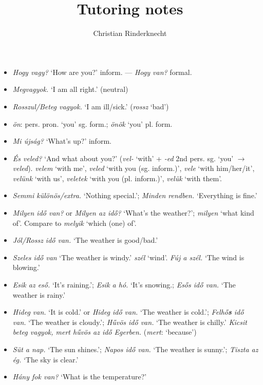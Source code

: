 \documentclass[a4paper,11pt]{article}
\title{Tutoring notes}
\date{\oldstylenums{2026}}
\author{Christian Rinderknecht}
\begin{document}
\maketitle

\begin{itemize}

  \item \emph{Hogy vagy?} `How are you?' inform. --- \emph{Hogy van?}
    formal.

  \item \emph{Megvagyok.} `I am all right.' (neutral)

  \item \emph{Rosszul/Beteg vagyok.} `I am ill/sick.' (\emph{rossz}
    `bad')

  \item \emph{ön}: pers. pron. `you' sg. form.; \emph{önök} `you'
    pl. form.

  \item \emph{Mi újság?} `What's up?' inform.

  \item \emph{És veled?} `And what about you?' (\emph{vel-} `with' +
    \emph{-ed} 2nd pers. sg. `you' $\rightarrow$
    \emph{veled}). \emph{velem} `with me', \emph{veled} `with you
    (sg. inform.)', \emph{vele} `with him/her/it', \emph{velünk} `with
    us', \emph{veletek} `with you (pl. inform.)', \emph{velük} `with
    them'.

  \item \emph{Semmi különös/extra.} `Nothing special.'; \emph{Minden
  rendben.} `Everything is fine.'

  \item \emph{Milyen idő van?} or \emph{Milyen az idő?} `What's the
    weather?'; \emph{milyen} `what kind of'. Compare to \emph{melyik}
    `which (one) of'.

  \item \emph{Jól/Rossz idő van.} `The weather is good/bad.'

  \item \emph{Szeles idő van} `The weather is windy.'  \emph{szél}
    `wind'. \emph{Fúj a szél.} `The wind is blowing.'

  \item \emph{Esik az eső.} `It's raining.'; \emph{Esik a hó.}  `It's
    snowing.; \emph{Esős idő van.} `The weather is rainy.'

  \item \emph{Hideg van.} `It is cold.' or \emph{Hideg idő van.}  `The
    weather is cold.'; \emph{Felhő\textbf{s} idő van.} `The weather is
    cloudy.'; \emph{Hűvös idő van.} `The weather is chilly.'
    \emph{Kicsit beteg vagyok, mert hűvös az idő Egerben.}
    (\emph{mert}: `because')

  \item \emph{Süt a nap.} `The sun shines.'; \emph{Napos idő van.}
    `The weather is sunny.'; \emph{Tiszta az ég.} `The sky is clear.'

  \item \emph{Hány fok van?} `What is the temperature?'

\end{itemize}
\end{document}
